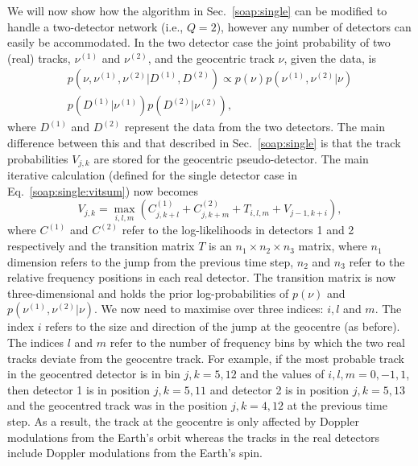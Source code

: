 We will now show how the algorithm in Sec.~\ref{soap:single} can be modified to handle a two-detector network (i.e., $Q=2$),  however any number of detectors can easily be accommodated. In the two detector case the joint probability of two (real) tracks, $\nu^{(1)}$ and $\nu^{(2)}$, and the geocentric track $\nu$, given the data, is
%
\begin{equation}
\begin{split}
p(\nu,\nu^{(1)},\nu^{(2)} | D^{(1)},D^{(2)}) \propto p(\nu)p(\nu^{(1)},\nu^{(2)} | \nu) \\
p(D^{(1)} | \nu^{(1)})p(D^{(2)} | \nu^{(2)}),
\end{split}
\end{equation}
%
where $D^{(1)}$ and $D^{(2)}$ represent the data from the two detectors. The
main difference between this and that described in Sec.~\ref{soap:single} is
that the track probabilities $V_{j,k}$ are stored for the geocentric
pseudo-detector. The main iterative calculation (defined for the single
detector case in Eq.~\ref{soap:single:vitsum}) now becomes
%
\begin{equation}
\label{soap:multidet:vitsum}
  V_{j,k} = \max_{i,l,m}({C}^{(1)}_{j,k+l} + {C}^{(2)}_{j,k+m} + T_{i,l,m} +V_{j-1,k+i}),
\end{equation}
%
where ${C}^{(1)}$ and ${C}^{(2)}$ refer to the log-likelihoods in detectors 1 and 2 respectively and the transition matrix $T$ is an $n_1\times n_2 \times n_3$ matrix, where $n_1$ dimension refers to the jump from the previous time step, $n_2$ and $n_3$ refer to the relative frequency positions in each real detector. The transition matrix is now three-dimensional and holds the prior log-probabilities of $p(\nu)$ and $p(\nu^{(1)},\nu^{(2)} | \nu)$.  We now need to maximise over three indices: $i,l$ and $m$. The index $i$ refers to the size and direction of the jump at the geocentre (as before). The indices $l$ and $m$ refer to the number of frequency bins by which the two real tracks deviate from the geocentre track. For example, if the most probable track in the geocentred detector is in bin $j,k = 5,12$ and the values of $i,l,m = 0,-1,1$, then detector 1 is in position $j,k={5,11}$ and detector 2 is in position $j,k={5,13}$ and the geocentred track was in the position $j,k={4,12}$ at the previous time step. As a result, the track at the geocentre is only affected by Doppler modulations from the Earth's orbit whereas the tracks in the real detectors include Doppler modulations from the Earth's spin.

